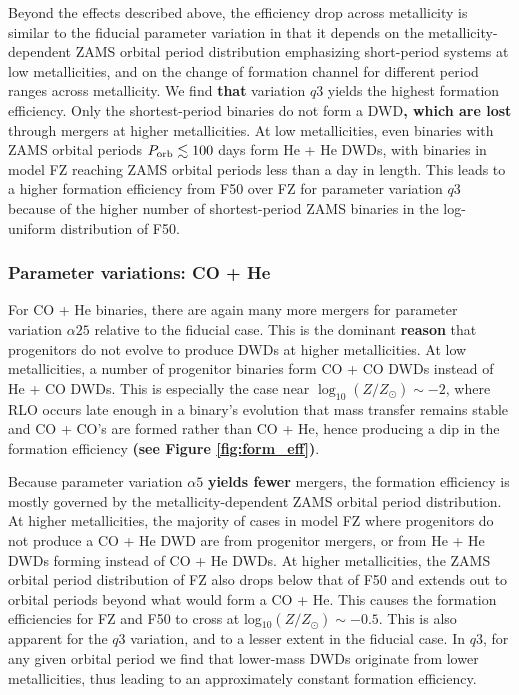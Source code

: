 \documentclass[twocolumn, linenumbers]{aastex631}
\begin{document}
Beyond the effects described above, the efficiency drop across metallicity is similar to the fiducial parameter variation in that it depends on the metallicity-dependent ZAMS orbital period distribution emphasizing short-period systems at low metallicities, and on the change of formation channel for different period ranges across metallicity. We find \textbf{that} variation $q3$ yields the highest formation efficiency. Only the shortest-period binaries do not form a DWD\textbf{, which are lost} through mergers at higher metallicities. At low metallicities, even binaries with ZAMS orbital periods $P_{\rm{orb}}\lesssim 100$ days form He + He DWDs, with binaries in model FZ reaching ZAMS orbital periods less than a day in length. This leads to a higher formation efficiency from F50 over FZ for parameter variation $q3$ because of the higher number of shortest-period ZAMS binaries in the log-uniform distribution of F50.

\subsubsection{\textbf{Parameter variations: CO + He}}\label{formeff_COHe_vars}
For CO + He binaries, there are again many more mergers for parameter variation $\alpha25$ relative to the fiducial case. This is the dominant \textbf{reason} that progenitors do not evolve to produce DWDs at higher metallicities. At low metallicities, a number of progenitor binaries form CO + CO DWDs instead of He + CO DWDs. This is especially the case near $\log_{10}(Z/Z_\odot)\sim -2$, where RLO occurs late enough in a binary's evolution that mass transfer remains stable and CO + CO's are formed rather than CO + He, hence producing a dip in the formation efficiency \textbf{(see Figure \ref{fig:form_eff})}.


Because parameter variation $\alpha5$ \textbf{yields fewer} mergers, the formation efficiency is mostly governed by the metallicity-dependent ZAMS orbital period distribution. At higher metallicities, the majority of cases in model FZ where progenitors do not produce a CO + He DWD are from progenitor mergers, or from He + He DWDs forming instead of CO + He DWDs. At higher metallicities, the ZAMS orbital period distribution of FZ also drops below that of F50 and extends out to orbital periods beyond what would form a CO + He. This causes the formation efficiencies for FZ and F50 to cross at log$_{10}(Z/Z_\odot)\sim-0.5$. This is also apparent for the $q3$ variation, and to a lesser extent in the fiducial case. In $q3$, for any given orbital period we find that lower-mass DWDs originate from lower metallicities, thus leading to an approximately constant formation efficiency.
\end{document}
